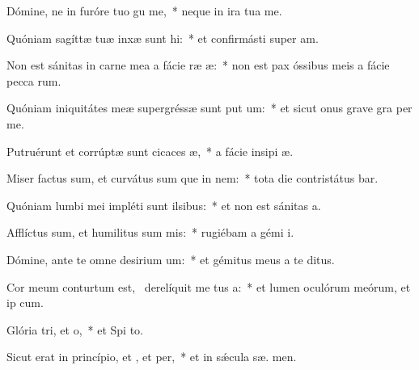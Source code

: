 \item Dómine, ne in furóre tuo gu me,~* neque in ira tua  me.
\item Quóniam sagíttæ tuæ inxæ sunt hi:~* et confirmásti super   am.
\item Non est sánitas in carne mea a fácie ræ æ:~* non est pax óssibus meis a fácie pecca rum.
\item Quóniam iniquitátes meæ supergréssæ sunt put um:~* et sicut onus grave gra  per me.
\item Putruérunt et corrúptæ sunt cicaces æ,~* a fácie insipi æ.
\item Miser factus sum, et curvátus sum que in nem:~* tota die contristátus bar.
\item Quóniam lumbi mei impléti sunt ilsibus:~* et non est sánitas   a.
\item Afflíctus sum, et humilitus sum mis:~* rugiébam a gémi  i.
\item Dómine, ante te omne desirium um:~* et gémitus meus a te   ditus.
\item Cor meum conturtum est,~\pscross{} derelíquit me tus a:~* et lumen oculórum meórum, et ip   cum.
\item Glória tri, et o,~* et Spi to.
\item Sicut erat in princípio, et , et per,~* et in sǽcula sæ. men.
